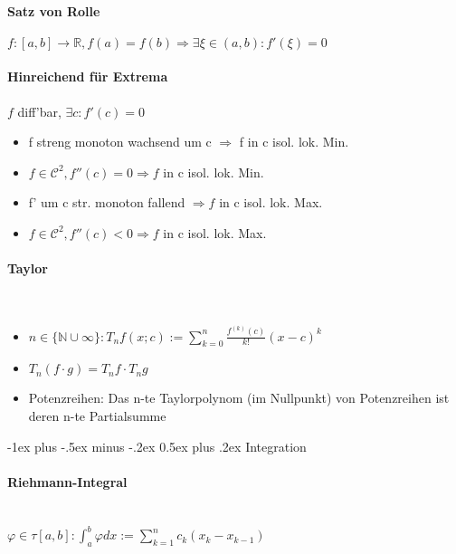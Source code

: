 \documentclass[paper=a3,paper=landscape, fontsize=9pt, DIV=30]{scrartcl}
\makeatletter
\newcommand{\real}{{\mathbb{R}}}
\newcommand{\nat}{\mathbb{N}}
\renewcommand{\section}{\@startsection{section}{1}{0mm}%
  {-1ex plus -.5ex minus -.2ex}%
  {0.5ex plus .2ex}%
  {\color{blue}\normalfont\large\bfseries}}
\makeatother
\begin{document}
\begin{multicols*}{4}
  \paragraph{Satz von Rolle}
  $f: [a,b] \rightarrow \real, f(a)=f(b) \Rightarrow \exists \xi \in (a,b): f'(\xi)=0$


  \paragraph{Hinreichend für Extrema}
  $f$ diff'bar, $\exists c: f'(c)=0$
  \begin{itemize}
  \item f streng monoton wachsend um c $\Rightarrow$ f in c isol. lok. Min.
  \item $f \in \mathscr{C}^2, f''(c)=0 \Rightarrow f$ in c isol. lok. Min.
  \item f' um c str. monoton fallend $\Rightarrow f$ in c isol. lok. Max.
  \item $f \in \mathscr{C}^2, f''(c)<0 \Rightarrow f$ in c isol. lok. Max.
  \end{itemize}


  \paragraph{Taylor}\hspace{0pt} \\
  \begin{itemize}
  	\item $ n \in \{\nat \cup \infty\}: T_nf(x;c):= \sum_{k=0}^{n}\frac{f^{(k)}(c)}{k!}(x-c)^k$
  	\item $T_n(f \cdot g)=T_nf \cdot T_ng$
  	\item Potenzreihen: Das n-te Taylorpolynom (im Nullpunkt) von Potenzreihen ist deren n-te Partialsumme
  \end{itemize}

  
  \section{Integration}


  \paragraph{Riehmann-Integral}\hspace{0pt} \\
  $\varphi \in \tau [a,b]: \int_{a}^{b}\varphi dx := \sum_{k=1}^{n}c_k(x_k-x_{k-1})$



\end{multicols*}
\end{document}
